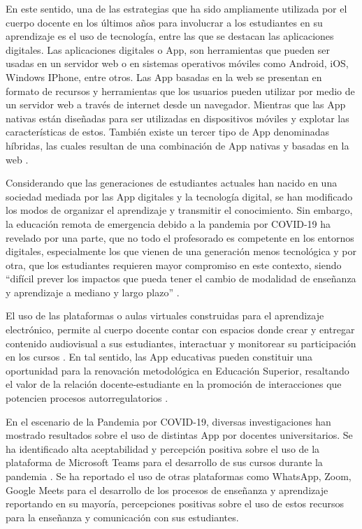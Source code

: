 \documentclass[spanish]{textolivre}
\begin{document}
En este sentido, una de las estrategias que ha sido ampliamente utilizada por el cuerpo docente en los últimos años para involucrar a los  estudiantes en su aprendizaje es el uso de tecnología, entre las que se destacan las aplicaciones digitales. Las aplicaciones digitales o App, son herramientas que pueden ser usadas en un servidor web o en sistemas operativos móviles como Android, iOS, Windows IPhone, entre otros. Las App basadas en la web se presentan en formato de recursos y herramientas que los  usuarios pueden utilizar por medio de un servidor web a través de internet desde un navegador. Mientras que las App nativas están diseñadas para ser utilizadas en dispositivos móviles y explotar las características de estos. También existe un tercer tipo de App denominadas híbridas, las cuales resultan de una combinación de App nativas y basadas en la web \cite[p. 12-13]{santiago_mobile_2015}.

Considerando que las generaciones de estudiantes actuales han nacido en una sociedad mediada por las App digitales y la tecnología digital, se han modificado los modos de organizar el aprendizaje y transmitir el conocimiento. Sin embargo, la educación remota de emergencia  debido a la pandemia por COVID-19 ha revelado por una parte, que no todo el profesorado es competente en los entornos digitales, especialmente los que vienen de una generación menos tecnológica \cite[p. 16-17]{cervantesgutierrez2020} y por otra, que los  estudiantes requieren mayor compromiso en este contexto, siendo “difícil prever los impactos que pueda tener el cambio de modalidad de enseñanza y aprendizaje a mediano y largo plazo” \cite[p. 22]{instituto_internacional_para_la_educacion_superior_en_america_latina_y_el_caribe_covid-19_2020}.

El uso de las plataformas o aulas virtuales construidas para el aprendizaje electrónico, permite al cuerpo docente contar con espacios donde crear y entregar contenido audiovisual a sus estudiantes, interactuar y monitorear su participación en los cursos \cite[p. 3]{ashrafi2020}. En tal sentido, las App educativas pueden constituir una oportunidad para la renovación metodológica en Educación Superior, resaltando el valor de la relación docente-estudiante en la promoción de interacciones que potencien procesos autorregulatorios \cite[p. 69]{zimmerman2002}. 

En el escenario de la Pandemia por COVID-19, diversas investigaciones han mostrado resultados sobre el uso de distintas App por docentes universitarios. Se ha identificado alta aceptabilidad y percepción positiva sobre el uso de la plataforma de Microsoft Teams para el desarrollo de sus cursos durante la pandemia \cite{zamora-antunano2021}. Se ha reportado el uso de otras  plataformas como WhatsApp, Zoom, Google Meets para el desarrollo de los procesos de enseñanza y aprendizaje \cite{almarzooq2020, budianto2021, akaloo2021, pramana2021} reportando en su mayoría, percepciones positivas sobre el uso de estos recursos para la enseñanza y comunicación con sus estudiantes. 
\end{document}
